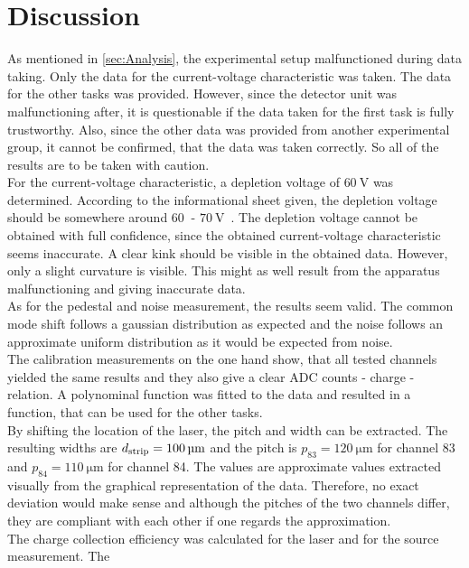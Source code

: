 \section{Discussion}
\label{sec:Discussion}
As mentioned in \autoref{sec:Analysis}, the experimental setup malfunctioned during data taking. Only
the data for the current-voltage characteristic was taken. The data for the other tasks was provided. However,
since the detector unit was malfunctioning after, it is questionable if the data taken for the first task is 
fully trustworthy. Also, since the other data was provided from another experimental group, it cannot be
confirmed, that the data was taken correctly. So all of the results are to be taken with caution.\\
For the current-voltage characteristic, a depletion voltage of $\qty{60}{\volt}$ was determined. According to the
informational sheet given, the depletion voltage should be somewhere around $\qty{60}{}$ - $\qty{70}{\volt}$~\cite{SiliconStrip}.
The depletion voltage cannot be obtained with full confidence, since the obtained current-voltage characteristic
seems inaccurate. A clear kink should be visible in the obtained data. However, only a slight curvature is visible.
This might as well result from the apparatus malfunctioning and giving inaccurate data.\\
As for the pedestal and noise measurement, the results seem valid. The common mode shift follows a gaussian distribution
as expected and the noise follows an approximate uniform distribution as it would be expected from noise.\\
The calibration measurements on the one hand show, that all tested channels yielded the same results and 
they also give a clear ADC counts - charge - relation. A polynominal function was fitted to the data and
resulted in a function, that can be used for the other tasks.\\
By shifting the location of the laser, the pitch and width can be extracted. The resulting widths are $d_{\mathrm{strip}} = \qty{100 \pm 0}{\micro\metre}$
and the pitch is $p_{83} = \qty{120}{\micro\metre}$ for channel 83 and $p_{84} = \qty{110}{\micro\metre}$ for channel 84.
The values are approximate values extracted visually from the graphical representation of the data. Therefore, no exact
deviation would make sense and although the pitches of the two channels differ, they are compliant with each
other if one regards the approximation.\\
The charge collection efficiency was calculated for the laser and for the source measurement. The
